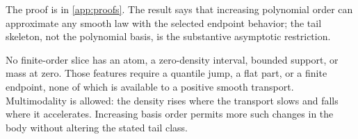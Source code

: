 The proof is in \cref{app:proofs}.  The result says that increasing polynomial
order can approximate any smooth law with the selected endpoint behavior;
the tail skeleton, not the polynomial basis, is the substantive asymptotic
restriction.

No finite-order slice has an atom, a zero-density interval, bounded support,
or mass at zero.  Those features require a quantile jump, a flat part, or a
finite endpoint, none of which is available to a positive smooth transport.
Multimodality is allowed: the density rises where the transport slows and
falls where it accelerates.  Increasing basis order permits more such
changes in the body without altering the stated tail class.

